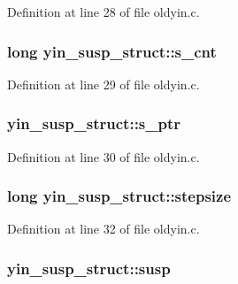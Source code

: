 Definition at line 28 of file oldyin.\+c.

\subsubsection[{\texorpdfstring{s\+\_\+cnt}{s_cnt}}]{\setlength{\rightskip}{0pt plus 5cm}long yin\+\_\+susp\+\_\+struct\+::s\+\_\+cnt}\hypertarget{structyin__susp__struct_a0747b5cf407ffb737710d97e9b6b4711}{}\label{structyin__susp__struct_a0747b5cf407ffb737710d97e9b6b4711}


Definition at line 29 of file oldyin.\+c.

\subsubsection[{\texorpdfstring{s\+\_\+ptr}{s_ptr}}]{ yin\+\_\+susp\+\_\+struct\+::s\+\_\+ptr}\hypertarget{structyin__susp__struct_ab60761876663def5eeccb88c03ae4f50}{}\label{structyin__susp__struct_ab60761876663def5eeccb88c03ae4f50}


Definition at line 30 of file oldyin.\+c.

\subsubsection[{\texorpdfstring{stepsize}{stepsize}}]{\setlength{\rightskip}{0pt plus 5cm}long yin\+\_\+susp\+\_\+struct\+::stepsize}\hypertarget{structyin__susp__struct_aca4a51a1b0e6e15fef714eb6ddc3e287}{}\label{structyin__susp__struct_aca4a51a1b0e6e15fef714eb6ddc3e287}


Definition at line 32 of file oldyin.\+c.

\subsubsection[{\texorpdfstring{susp}{susp}}]{ yin\+\_\+susp\+\_\+struct\+::susp}\hypertarget{structyin__susp__struct_a8eea450d2a654417e8e07eb4f5f9ae4c}{}\label{structyin__susp__struct_a8eea450d2a654417e8e07eb4f5f9ae4c}


